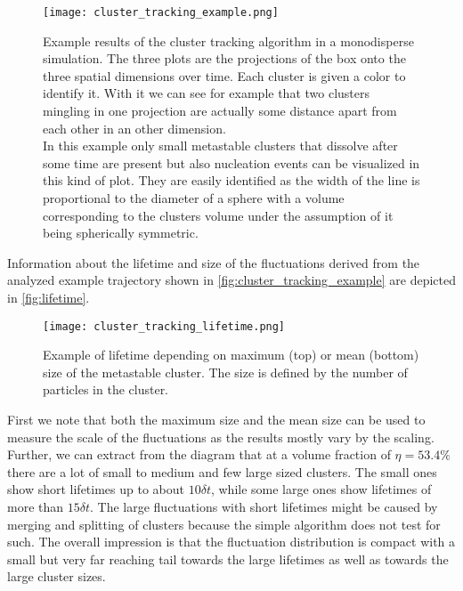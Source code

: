 \begin{figure}[h]
\centering
\texttt{[image: cluster\_tracking\_example.png]}
\caption[Individual cluster tracking example]{Example results of the cluster tracking algorithm in a monodisperse simulation. The three plots are the projections of the box onto the three spatial dimensions over time. Each cluster is given a color to identify it. With it we can see for example that two clusters mingling in one projection are actually some distance apart from each other in an other dimension.\\
In this example only small metastable clusters that dissolve after some time are present but also nucleation events can be visualized in this kind of plot. They are easily identified as the width of the line is proportional to the diameter of a sphere with a volume corresponding to the clusters volume under the assumption of it being spherically symmetric.}
\label{fig:cluster_tracking_example}
\end{figure}
\newpage
Information about the lifetime and size of the fluctuations derived from the analyzed example trajectory shown in \autoref{fig:cluster_tracking_example} are depicted in \autoref{fig:lifetime}.\\
\begin{figure}[h]
\centering
\texttt{[image: cluster\_tracking\_lifetime.png]}
\caption[Example of correlation between an unstable cluster's size and lifetime]{Example of lifetime depending on  maximum (top) or mean (bottom) size of the metastable cluster. The size is defined by the number of particles in the cluster.}
\label{fig:lifetime}
\end{figure}
\FloatBarrier
First we note that both the maximum size and the mean size can be used to measure the scale of the fluctuations as the results mostly vary by the scaling. Further, we can extract from the diagram that at a volume fraction of $\eta = 53.4\%$ there are a lot of small to medium and few large sized clusters. The small ones show short lifetimes up to about $10 \delta t$, while some large ones show lifetimes of more than $15 \delta t$. The large fluctuations with short lifetimes might be caused by merging and splitting of clusters because the simple algorithm does not test for such. The overall impression is that the fluctuation distribution is compact with a small but very far reaching tail towards the large lifetimes as well as towards the large cluster sizes.
\FloatBarrier



